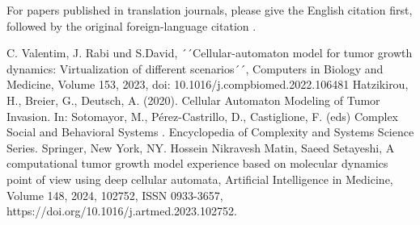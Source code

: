 \documentclass[conference]{IEEEtran}
\begin{document}
For papers published in translation journals, please give the English 
citation first, followed by the original foreign-language citation \cite{b6}.

\begin{thebibliography}{00}
 C. Valentim, J. Rabi und S.David, ´´Cellular-automaton model for tumor growth dynamics: Virtualization of different scenarios´´,
Computers in Biology and Medicine, Volume 153, 2023, doi: 10.1016/j.compbiomed.2022.106481
 Hatzikirou, H., Breier, G., Deutsch, A. (2020). Cellular Automaton Modeling of Tumor Invasion. In: Sotomayor, M., Pérez-Castrillo, D., Castiglione, F. (eds) Complex Social and Behavioral Systems . Encyclopedia of Complexity and Systems Science Series. Springer, New York, NY.
 Hossein Nikravesh Matin, Saeed Setayeshi,
A computational tumor growth model experience based on molecular dynamics point of view using deep cellular automata,
Artificial Intelligence in Medicine,
Volume 148,
2024,
102752,
ISSN 0933-3657,
https://doi.org/10.1016/j.artmed.2023.102752.
\end{thebibliography}

\vspace{12pt}
\end{document}
